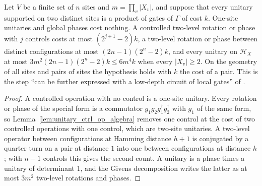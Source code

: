 \begin{theorem}
    \label{thm:unitary_universality}
    \leanok
    Let $V$ be a finite set of $n$ sites and $m=\prod_v|X_v|$, and suppose that every
    unitary supported on two distinct sites is a product of gates of $\Gamma$ of cost $k$.
    One-site unitaries and global phases cost nothing. A controlled two-level rotation or
    phase with $j$ controls costs at most $(2^{j+1}-2)k$, a two-level rotation or phase
    between distinct configurations at most $(2n-1)(2^n-2)k$, and every unitary on
    $\mathcal H_X$ at most $3m^2(2n-1)(2^n-2)k\le6m^4k$ when every $|X_v|\ge2$. On the geometry
    of all sites and pairs of sites the hypothesis holds with $k$ the cost of a pair. This is
    the step ``can be further expressed with a low-depth circuit of local gates'' of
    \cite[caption of Fig.~1]{Malz2024Preparation}.
\end{theorem}
\begin{proof}\leanok
    A controlled operation with no control is a one-site unitary. Every rotation or phase of
    the special form is a commutator $g_1g_2g_1^\dagger g_2^\dagger$ with $g_1$ of the same
    form, so Lemma~\ref{lem:unitary_ctrl_op_algebra} removes one control at the cost of two
    controlled operations with one control, which are two-site unitaries. A two-level
    operator between configurations at Hamming distance $h+1$ is conjugated by a quarter
    turn on a pair at distance $1$ into one between configurations at distance $h$; with
    $n-1$ controls this gives the second count. A unitary is a phase times a unitary of
    determinant $1$, and the Givens decomposition writes the latter as at most $3m^2$
    two-level rotations and phases.
\end{proof}


